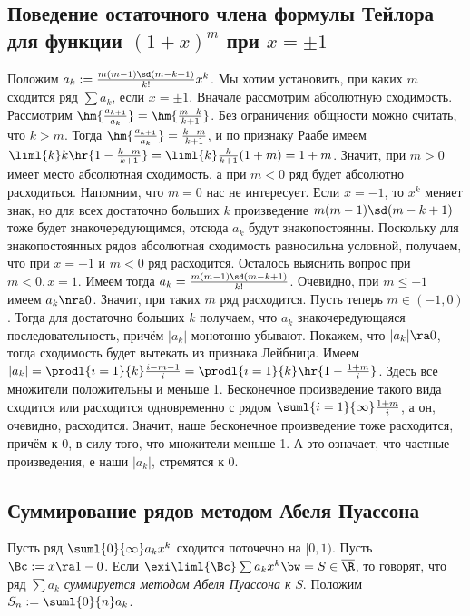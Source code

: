 \documentclass[a4paper]{article}
\begin{document}
\subsection{Поведение остаточного члена формулы Тейлора для функции $(1+x)^m$ при $x=\pm 1$}

Положим $a_k := \frac{m(m-1)\sd(m-k+1)}{k!}x^k$. Мы хотим установить, при каких $m$ сходится ряд $\sum a_k$, если
$x =\pm 1$. Вначале рассмотрим абсолютную сходимость. Рассмотрим $\hm{\frac{a_{k+1}}{a_k}} = \hm{\frac{m-k}{k+1}}$.
Без ограничения общности можно считать, что $k > m$. Тогда $\hm{\frac{a_{k+1}}{a_k}} = \frac{k-m}{k+1}$, и по
признаку Раабе имеем $\liml{k} k\hr{ 1-\frac{k-m}{k+1}} =\liml{k} \frac{k}{k+1}(1+m) = 1+m$. Значит, при $m > 0$
имеет место абсолютная сходимость, а при $m < 0$ ряд будет абсолютно расходиться. Напомним, что $m=0$ нас не
интересует. Если $x=-1$, то $x^k$ меняет знак, но для всех достаточно больших $k$ произведение $m(m-1)\sd(m-k+1)$
тоже будет знакочередующимся, отсюда $a_k$ будут знакопостоянны. Поскольку для знакопостоянных рядов абсолютная
сходимость равносильна условной, получаем, что при $x=-1$ и $m < 0$ ряд расходится. Осталось выяснить вопрос
при $m < 0, x=1$. Имеем тогда $a_k =\frac{m(m-1)\sd(m-k+1)}{k!}$. Очевидно, при $m \le -1$ имеем $a_k \nra 0$.
Значит, при таких $m$ ряд расходится. Пусть теперь $m \in (-1,0)$. Тогда для достаточно больших $k$ получаем, что
$a_k$ знакочередующаяся последовательность, причём $|a_k|$ монотонно убывают. Покажем, что $|a_k| \ra 0$, тогда
сходимость будет вытекать из признака Лейбница. Имеем $|a_k| = \prodl{i=1}{k}\frac{i-m-1}{i}=
\prodl{i=1}{k}\hr{1-\frac{1+m}{i}} $. Здесь все множители положительны и меньше 1. Бесконечное
произведение такого вида сходится или расходится одновременно с рядом $\suml{i=1}{\infty} \frac{1+m}{i}$, а он,
очевидно, расходится. Значит, наше бесконечное произведение тоже расходится, причём к 0, в силу того, что
множители меньше 1. А это означает, что частные произведения, е наши $|a_k|$, стремятся к 0.

\subsection{Суммирование рядов методом Абеля Пуассона}

\begin{df}
Пусть ряд $\suml{0}{\infty} a_k x^k$ сходится поточечно на $[0,1)$. Пусть $\Bc := x \ra 1-0$. Если
$\exi \liml{\Bc} \sum a_k x^k\bw=S \in \overline{\R}$,
то говорят, что ряд $\sum a_k$ \emph{суммируется методом Абеля Пуассона к} $S$. Положим $S_n := \suml{0}{n}a_k$.
\end{df}
\end{document}
